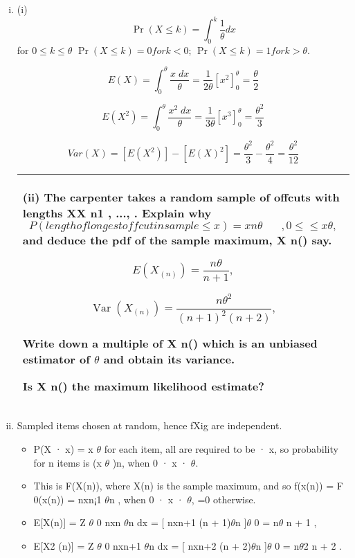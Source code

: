 \documentclass[a4paper,12pt]{article}
\begin{document}
\begin{enumerate}[(i)]
\item (i) \[ \Pr(X \leq k) = \int^{k}_{0} \frac{1}{\theta} dx\] for $0\leq k \leq \theta$
$ \Pr(X \leq k) = 0 for k < 0$; $\Pr(X \leq k) = 1 for k > \theta$.

\[E(X) = \int^{\theta}_{0} \frac{x\;dx}{\theta} = \frac{1}{2\theta}\left[ x^2 \right]^{\theta}_{0} = \frac{\theta}{2}\]



\[E(X^2) = \int^{\theta}_{0} \frac{x^2\;dx}{\theta} = \frac{1}{3\theta}\left[ x^3 \right]^{\theta}_{0} = \frac{\theta^2}{3}\]

\[ Var(X) = [E(X^2)] - [E(X)^2] = \frac{\theta^2}{3} - \frac{\theta^2}{4} = \frac{\theta^2}{12}\]
\newpage
 \begin{table}[ht!]
 \centering
 \begin{tabular}{|p{15cm}|}
 \hline  
(ii) The carpenter takes a random sample of offcuts with lengths XX n1 , ..., . Explain why
\[P (length of longest offcut in sample ≤ x) = 
x n θ
  
   ,  0 ≤≤ x θ ,
\]
and deduce the pdf of the sample maximum, X n() say.


\[ E(X_{(n)}) = \frac{n \theta}{n+1},\]

\[ \operatorname{Var}(X_{(n)}) = \frac{n \theta^2}{(n+1)^2(n+2)},\]


Write down a multiple of  X n() which is an unbiased estimator of 
$\theta$
 and obtain its
variance.


Is  X n() the maximum likelihood estimate? \\ \hline 
  \end{tabular}
\end{table}
\item Sampled items chosen at random, hence fXig are independent. 
\begin{itemize}
\item P(X · x) =
x
$\theta$ for each item, all are required to be · x, so probability for n items is (x
$\theta$ )n,
when 0 · x · $\theta$. 
\item This is F(X(n)), where X(n) is the sample maximum, and
so f(x(n)) = F
0(x(n)) = nxn¡1
$\theta$n , when 0 · x · $\theta$, =0 otherwise.
\item E[X(n)] =
Z $\theta$
0
nxn
$\theta$n dx = [ nxn+1
(n + 1)$\theta$n ]$\theta$
0 = n$\theta$
n + 1
,
\item E[X2
(n)] =
Z $\theta$
0
nxn+1
$\theta$n dx = [ nxn+2
(n + 2)$\theta$n ]$\theta$
0 = n$\theta$2
n + 2
.


\end{itemize}
\end{enumerate}
\end{document}
